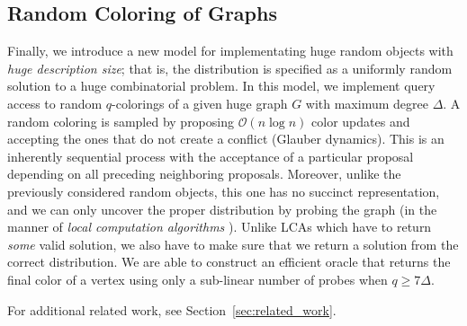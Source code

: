 \subsection{Random Coloring of Graphs}%
\label{sec:random_coloring_of_graphs}
Finally, we introduce a new model for implementating huge random objects with \emph{huge description size};
that is, the distribution is specified as a uniformly random solution to a huge combinatorial problem.
In this model, we implement query access to random $q$-colorings of a given huge graph $G$ with maximum degree $\Delta$.
A random coloring is sampled by proposing $\mathcal O(n\log n)$ color updates and accepting the ones that do not create a conflict (Glauber dynamics).
This is an inherently sequential process with the acceptance of a particular proposal depending on all preceding neighboring proposals.
Moreover, unlike the previously considered random objects, this one has no succinct representation,
and we can only uncover the proper distribution by probing the graph (in the manner of \emph{local computation algorithms} \cite{LCA}).
Unlike LCAs which have to return \emph{some} valid solution, we also have to make sure that we return a solution from the correct distribution.
We are able to construct an efficient oracle that returns the final color of a vertex using only a sub-linear number of probes when $q\ge 7\Delta$.

For additional related work, see Section~\ref{sec:related_work}.

